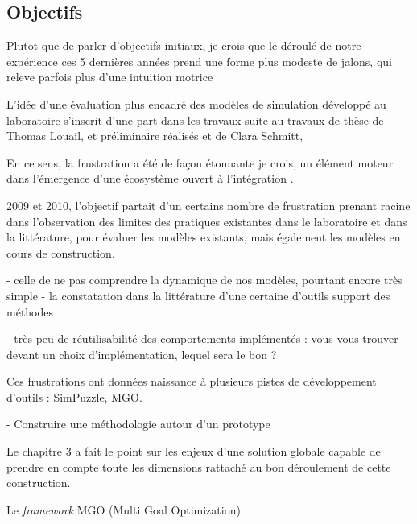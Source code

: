 
\subsection{Objectifs}

Plutot que de parler d'objectifs initiaux, je crois que le déroulé de notre expérience ces 5 dernières années prend une forme plus modeste de jalons, qui releve parfois plus d'une intuition motrice 

L'idée d'une évaluation plus encadré des modèles de simulation développé au laboratoire s'inscrit d'une part dans les travaux  suite au travaux de thèse de Thomas Louail, et  préliminaire réalisés et de Clara Schmitt, 

En ce sens, la frustration a été de façon étonnante je crois, un élément moteur dans l'émergence d'une écosystème ouvert à l'intégration  .

 2009 et 2010, l'objectif partait d'un certains nombre de frustration prenant racine  dans l'observation des limites des pratiques existantes dans le laboratoire et dans la littérature, pour évaluer les modèles existants, mais également les modèles en cours de construction.

  - celle de ne pas comprendre la dynamique de nos modèles, pourtant encore très simple
  - la constatation dans la littérature d'une certaine d'outils support des méthodes
  
  - très peu de réutilisabilité des comportements implémentés : vous vous trouver devant un choix d'implémentation, lequel sera le bon ? 


Ces frustrations ont données naissance à plusieurs pistes de développement d'outils : SimPuzzle, MGO.


- Construire une méthodologie autour d'un prototype














Le chapitre 3 a fait le point sur les enjeux d'une solution globale capable de prendre en compte toute les dimensions rattaché au bon déroulement de cette construction.

Le \textit{framework} MGO (Multi Goal Optimization) 

